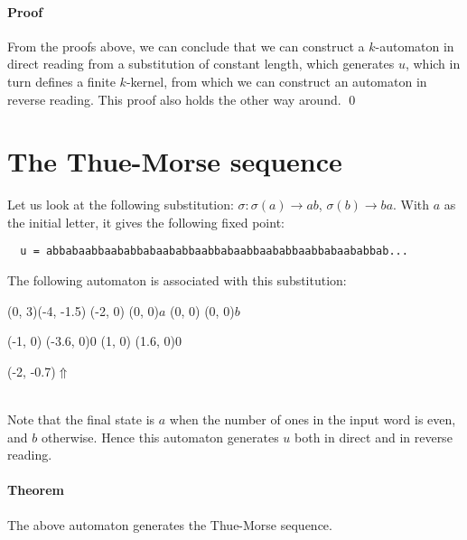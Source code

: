\documentclass{article}
\begin{document}
\paragraph{Proof}
From the proofs above, we can conclude that we can construct a $k$-automaton in
direct reading from a substitution of constant length, which generates $u$,
which in turn defines a finite $k$-kernel, from which we can construct an
automaton in reverse reading. This proof also holds the other way around. \qed

\section*{The Thue-Morse sequence}
Let us look at the following substitution: $\sigma: \sigma(a) \rightarrow ab$,
$\sigma(b) \rightarrow ba$. With $a$ as the initial letter, it gives the
following fixed point:
\begin{verbatim}
  u = abbabaabbaababbabaababbaabbabaabbaababbaabbabaababbab...
\end{verbatim}
The following automaton is associated with this
substitution:\\
\begin{graph}(0, 3)(-4, -1.5)
  (-2, 0) (0, 0){$a$}
  (0, 0)  (0, 0){$b$}

  (-1, 0) \freetext(-3.6, 0){0}
   
   
  (1, 0) \freetext(1.6, 0){0}

  \freetext(-2, -0.7){$\Uparrow$}
\end{graph}\\
Note that the final state is $a$ when the number of ones in the input word
is even, and $b$ otherwise. Hence this automaton generates $u$ both in direct
and in reverse reading.

\paragraph{Theorem} The above automaton generates the Thue-Morse sequence.
\end{document}
